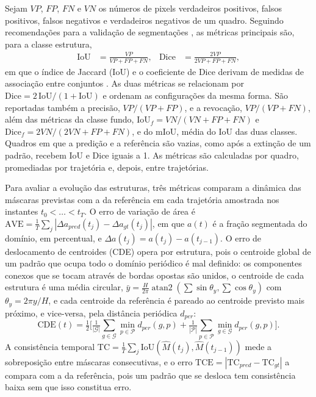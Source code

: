 \documentclass[12pt]{article}
\begin{document}
Sejam $VP$, $FP$, $FN$ e $VN$ os números de pixels verdadeiros positivos, falsos positivos, falsos negativos e verdadeiros negativos de um quadro. Seguindo recomendações para a validação de segmentações \cite{taha2015,maierhein2024}, as métricas principais são, para a classe estrutura,
\begin{align}
\mathrm{IoU}&=\frac{VP}{VP+FP+FN}, & \mathrm{Dice}&=\frac{2VP}{2VP+FP+FN},
\end{align}
em que o índice de Jaccard (IoU) e o coeficiente de Dice derivam de medidas de associação entre conjuntos \cite{jaccard1912,dice1945}. As duas métricas se relacionam por $\mathrm{Dice}=2\,\mathrm{IoU}/(1+\mathrm{IoU})$ e ordenam as configurações da mesma forma. São reportadas também a precisão, $VP/(VP+FP)$, e a revocação, $VP/(VP+FN)$, além das métricas da classe fundo, $\mathrm{IoU}_{f}=VN/(VN+FP+FN)$ e $\mathrm{Dice}_{f}=2VN/(2VN+FP+FN)$, e do mIoU, média do IoU das duas classes. Quadros em que a predição e a referência são vazias, como após a extinção de um padrão, recebem IoU e Dice iguais a 1. As métricas são calculadas por quadro, promediadas por trajetória e, depois, entre trajetórias.

Para avaliar a evolução das estruturas, três métricas comparam a dinâmica das máscaras previstas com a da referência em cada trajetória amostrada nos instantes $t_0<\dots<t_T$. O erro de variação de área é $\mathrm{AVE}=\frac{1}{T}\sum_j|\Delta a_{pred}(t_j)-\Delta a_{gt}(t_j)|$, em que $a(t)$ é a fração segmentada do domínio, em percentual, e $\Delta a(t_j)=a(t_j)-a(t_{j-1})$. O erro de deslocamento de centroides (CDE) opera por estrutura, pois o centroide global de um padrão que ocupa todo o domínio periódico é mal definido: os componentes conexos que se tocam através de bordas opostas são unidos, o centroide de cada estrutura é uma média circular, $\bar y=\frac{H}{2\pi}\operatorname{atan2}(\sum\sin\theta_y,\sum\cos\theta_y)$ com $\theta_y=2\pi y/H$, e cada centroide da referência é pareado ao centroide previsto mais próximo, e vice-versa, pela distância periódica $d_{per}$:
\begin{equation}
\mathrm{CDE}(t)=\tfrac12\Big[\tfrac{1}{|\mathcal{G}|}\textstyle\sum_{g\in\mathcal{G}}\min_{p\in\mathcal{P}}d_{per}(g,p)+\tfrac{1}{|\mathcal{P}|}\sum_{p\in\mathcal{P}}\min_{g\in\mathcal{G}}d_{per}(g,p)\Big].
\end{equation}
A consistência temporal $\mathrm{TC}=\frac{1}{T}\sum_j\mathrm{IoU}(\hat M(t_j),\hat M(t_{j-1}))$ mede a sobreposição entre máscaras consecutivas, e o erro $\mathrm{TCE}=|\mathrm{TC}_{pred}-\mathrm{TC}_{gt}|$ a compara com a da referência, pois um padrão que se desloca tem consistência baixa sem que isso constitua erro.
\end{document}
